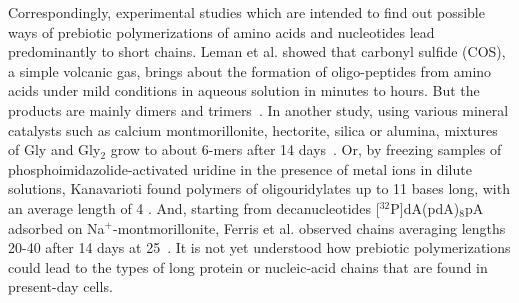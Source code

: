 \documentclass[journal=jacsat,manuscript=article,layout=twocolumn]{achemso}
\begin{document}
Correspondingly, experimental studies which are intended to find out possible ways of prebiotic 
polymerizations of amino acids and nucleotides lead predominantly to short chains. Leman et al. 
showed that carbonyl sulfide (COS), a simple volcanic gas, brings about the formation of 
oligo-peptides from amino acids under mild conditions in aqueous solution in minutes to hours. But
the products are mainly dimers and trimers~\cite{Leman2004a}.  In another study, using various 
mineral 
catalysts such as calcium montmorillonite, hectorite, silica or alumina, mixtures of Gly and 
Gly$_2$ 
grow to about 6-mers after 14 days~\cite{Rode1997,Rode1999}.  Or, by freezing samples of 
phosphoimidazolide-activated uridine in the presence of metal ions in dilute solutions, 
Kanavarioti 
found polymers of oligouridylates up to 11 bases long, with an average length of 4 
\cite{Kanavarioti2001}.  And, starting from decanucleotides [$^{32}$P]dA(pdA)$_8$pA adsorbed on 
Na$^+$-montmorillonite, Ferris et al. observed chains averaging lengths 20-40 after 14 days at 
25\textcelsius\ \cite{Ferris1996}.  It is not yet understood how prebiotic polymerizations could 
lead to the types of long protein or nucleic-acid chains that are found in present-day cells.
\end{document}
